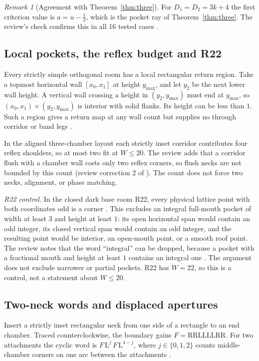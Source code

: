 \documentclass[11pt]{article}
\theoremstyle{definition}
\theoremstyle{remark}
\newtheorem{remark}{Remark}
\begin{document}
\begin{remark}[Agreement with Theorem~\ref{thm:three}]
For $D_1=D_2=3k+4$ the first criterion value is $a=u-\tfrac12$, which is the
pocket ray of Theorem~\ref{thm:three}. The review's check confirms this in all
16 tested cases \cite{d201}.
\end{remark}

\subsection{Local pockets, the reflex budget and R22}
Every strictly simple orthogonal room has a local rectangular return region.
Take a topmost horizontal wall $[x_0,x_1]$ at height $y_{\max}$, and let $y_2$
be the next lower wall height. A vertical wall crossing a height in
$(y_2,y_{\max})$ must end at $y_{\max}$, so $(x_0,x_1)\times(y_2,y_{\max})$ is
interior with solid flanks. Its height can be less than $1$. Such a region gives
a return map at any wall count but supplies no through corridor or band legs
\cite{R2,d201}.

In the aligned three-chamber layout each strictly inset corridor contributes four
reflex shoulders, so at most two fit at $W\le 20$. The review adds that a corridor
flush with a chamber wall costs only two reflex corners, so flush necks are not
bounded by this count (review correction 2 of \cite{d201}). The count does not
force two necks, alignment, or phase matching.

\emph{R22 control.} In the closed dark base room R22, every physical lattice
point with both coordinates odd is a corner \cite{d154}. This excludes an
integral full-mouth pocket of width at least $3$ and height at least $1$: its open
horizontal span would contain an odd integer, its closed vertical span would
contain an odd integer, and the resulting point would be interior, an open-mouth
point, or a smooth roof point. The review notes that the word ``integral'' can be
dropped, because a pocket with a fractional mouth and height at least $1$
contains an integral one \cite{d201}. The argument does not exclude narrower or
partial pockets. R22 has $W=22$, so this is a control, not a statement about
$W\le 20$.

\subsection{Two-neck words and displaced apertures}
Insert a strictly inset rectangular neck from one side of a rectangle to an end
chamber. Traced counterclockwise, the boundary gains $F=\mathrm{RRLLLLRR}$. For
two attachments the cyclic word is $F\,\mathrm{L}^j\,F\,\mathrm{L}^{4-j}$, where
$j\in\{0,1,2\}$ counts middle-chamber corners on one arc between the attachments
\cite{R3,d201}.
\end{document}

